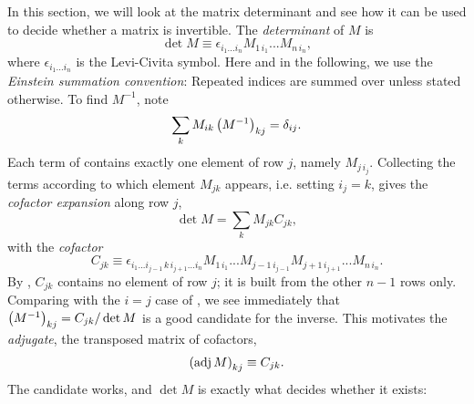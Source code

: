 In this section, we will look at the matrix determinant and see how it can be
used to decide whether a matrix is invertible.
The {\it determinant}
of $M$ is
\begin{equation}\label{eq:determinant}
  \det M\equiv\epsilon_{i_1...i_n}M_{1\,i_1}...M_{n\,i_n},
\end{equation}
where $\epsilon_{i_1...i_n}$ is the Levi-Civita symbol. Here and in the
following, we use the {\it Einstein summation
convention}: Repeated indices are summed
over unless stated otherwise.
To find $M^{-1}$, note 
\begin{equation}\label{eq:inverseColumns}
  \sum_k M_{ik}\left(M^{-1}\right)_{kj}=\delta_{ij}.
\end{equation}
Each term of  contains exactly one
element of row $j$, namely $M_{j\,i_j}$. Collecting the terms according to
which element $M_{jk}$ appears, i.e. setting $i_j=k$, gives
the {\it cofactor expansion} along row $j$,
\begin{equation}\label{eq:cofactorExpansion}
  \det M=\sum_k M_{jk}C_{jk},
\end{equation}
with the {\it cofactor}
\begin{equation}\label{eq:cofactor}
  C_{jk}\equiv\epsilon_{i_1...i_{j-1}\,k\,i_{j+1}...i_n}
  M_{1\,i_1}...M_{j-1\,i_{j-1}}M_{j+1\,i_{j+1}}...M_{n\,i_n}.
\end{equation}
By , $C_{jk}$ contains no element of row $j$; it is
built from the other $n-1$ rows only. Comparing 
with the $i=j$ case of ,
we see immediately that
$\left(M^{-1}\right)_{kj}=C_{jk}/\det M$ is a good candidate for the inverse. This motivates the
{\it adjugate}, the transposed matrix of cofactors,
\begin{equation}
  \left(\operatorname{adj} M\right)_{kj}\equiv C_{jk}.
\end{equation}
The candidate works, and $\det M$ is exactly what decides whether it exists:
